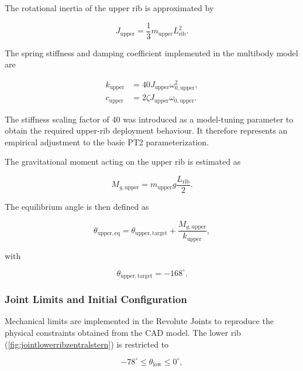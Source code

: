 	The rotational inertia of the upper rib is approximated by
	
	\begin{equation}
		J_{\mathrm{upper}}
		=
		\frac{1}{3}m_{\mathrm{upper}}L_{\mathrm{rib}}^2.
	\end{equation}
	
	The spring stiffness and damping coefficient implemented in the multibody model are
	
	\begin{align}
		k_{\mathrm{upper}}
		&=40J_{\mathrm{upper}}\omega_{0,\mathrm{upper}}^2,\\
		c_{\mathrm{upper}}
		&=2\zeta J_{\mathrm{upper}}\omega_{0,\mathrm{upper}}.
	\end{align}
	
	The stiffness scaling factor of 40 was introduced as a model-tuning parameter to obtain the required upper-rib deployment behaviour. It therefore represents an empirical adjustment to the basic PT2 parameterization.
	
	The gravitational moment acting on the upper rib is estimated as
	
	\begin{equation}
		M_{g,\mathrm{upper}}
		=
		m_{\mathrm{upper}}g\frac{L_{\mathrm{rib}}}{2}.
	\end{equation}
	
	The equilibrium angle is then defined as
	
	\begin{equation}
		\theta_{\mathrm{upper,eq}}
		=
		\theta_{\mathrm{upper,target}}
		+
		\frac{M_{g,\mathrm{upper}}}{k_{\mathrm{upper}}},
	\end{equation}
	
	with
	
	\begin{equation}
		\theta_{\mathrm{upper,target}}=-168^\circ.
	\end{equation}
	
	\subsubsection{Joint Limits and Initial Configuration}
	
	Mechanical limits are implemented in the Revolute Joints to reproduce the physical constraints obtained from the CAD model. The lower rib (\ref{fig:jointlowerribzentralstern}) is restricted to
	
	\begin{equation}
		-78^\circ
		\leq
		\theta_{\mathrm{low}}
		\leq
		0^\circ,
	\end{equation}
	
